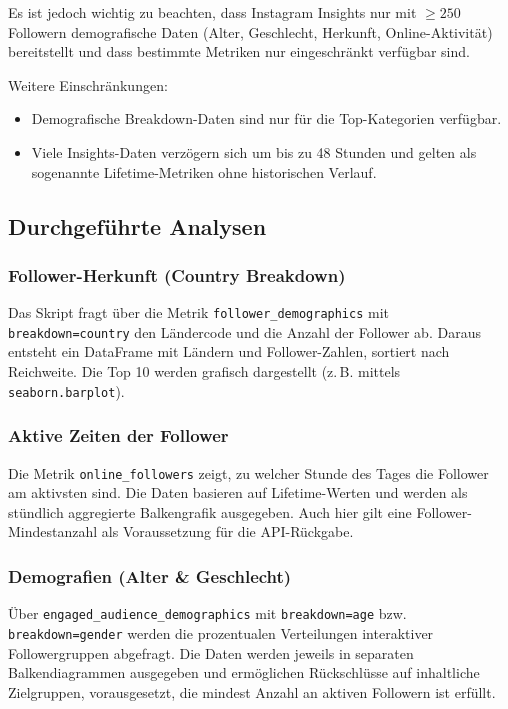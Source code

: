 \documentclass[a4paper,12pt]{article}
\begin{document}
Es ist jedoch wichtig zu beachten, dass Instagram Insights nur mit $ \geq 250 $ Followern demografische Daten (Alter, Geschlecht, Herkunft, Online-Aktivität) bereitstellt und dass bestimmte Metriken nur eingeschränkt verfügbar sind.

Weitere Einschränkungen:
\begin{itemize}
    \item Demografische Breakdown-Daten sind nur für die Top-Kategorien verfügbar.
    \item Viele Insights-Daten verzögern sich um bis zu 48 Stunden und gelten als sogenannte Lifetime-Metriken ohne historischen Verlauf.
\end{itemize}

\subsection{Durchgeführte Analysen}

\subsubsection*{Follower-Herkunft (Country Breakdown)}

Das Skript fragt über die Metrik \texttt{follower\_demographics} mit \texttt{breakdown=country} den Ländercode und die Anzahl der Follower ab. Daraus entsteht ein DataFrame mit Ländern und Follower-Zahlen, sortiert nach Reichweite. Die Top 10 werden grafisch dargestellt (z.\,B. mittels \texttt{seaborn.barplot}).
\clearpage
\subsubsection*{Aktive Zeiten der Follower}

Die Metrik \texttt{online\_followers} zeigt, zu welcher Stunde des Tages die Follower am aktivsten sind. Die Daten basieren auf Lifetime-Werten und werden als stündlich aggregierte Balkengrafik ausgegeben. Auch hier gilt eine Follower-Mindestanzahl als Voraussetzung für die API-Rückgabe.

\subsubsection*{Demografien (Alter \& Geschlecht)}

Über \texttt{engaged\_audience\_demographics} mit \texttt{breakdown=age} bzw. \texttt{breakdown=gender} werden die prozentualen Verteilungen interaktiver Followergruppen abgefragt. Die Daten werden jeweils in separaten Balkendiagrammen ausgegeben und ermöglichen Rückschlüsse auf inhaltliche Zielgruppen, vorausgesetzt, die mindest Anzahl an aktiven Followern ist erfüllt.
\end{document}
